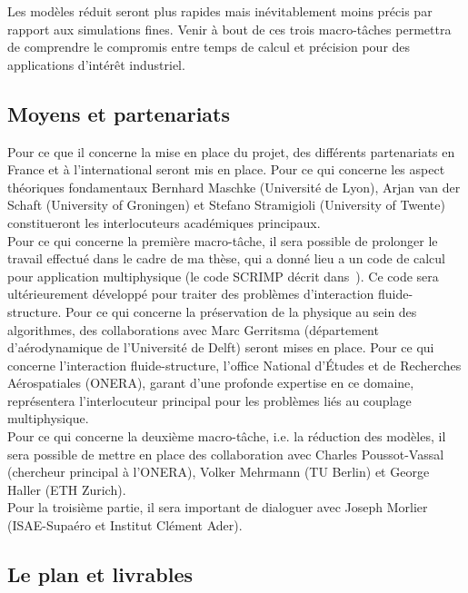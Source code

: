 \documentclass[french]{article}
\begin{document}
Les modèles réduit seront plus rapides mais inévitablement moins précis par rapport aux simulations fines. Venir à bout de ces trois macro-tâches permettra de comprendre le compromis entre temps de calcul et précision pour des applications d'intérêt industriel. 

\subsection{Moyens et partenariats}
Pour ce que il concerne la mise en place du projet, des différents partenariats en France et \`a l'international seront mis en place. Pour ce qui concerne les aspect théoriques fondamentaux Bernhard Maschke (Universit\'e de Lyon), Arjan van der Schaft (University of Groningen) et Stefano Stramigioli (University of Twente) constitueront les interlocuteurs académiques principaux. \\

Pour ce qui concerne la première macro-tâche, il sera possible de prolonger le travail effectué dans le cadre de ma thèse, qui a donn\'e lieu a un code de calcul pour application multiphysique (le code SCRIMP décrit dans~\cite{brugnoli2021num}). Ce code sera ultérieurement développé pour traiter des problèmes d'interaction fluide-structure. Pour ce qui concerne la préservation de la physique au sein des algorithmes, des collaborations avec Marc Gerritsma (département d'aérodynamique de l'Universit\'e de Delft) seront mises en place. Pour ce qui concerne l'interaction fluide-structure, l'office National d'Études et de Recherches Aérospatiales (ONERA), garant d'une profonde expertise en ce domaine, représentera l'interlocuteur principal pour les problèmes liés au couplage multiphysique. 
\\


Pour ce qui concerne la deuxième macro-tâche, i.e. la réduction des modèles, il sera possible de mettre en place des collaboration avec Charles Poussot-Vassal (chercheur principal \`a l'ONERA),  Volker Mehrmann (TU Berlin) et George Haller (ETH Zurich). \\
 
Pour la troisième partie, il sera important de dialoguer avec Joseph Morlier (ISAE-Supa\'ero et Institut Clément Ader).
 

\subsection{Le plan et livrables}
\end{document}
